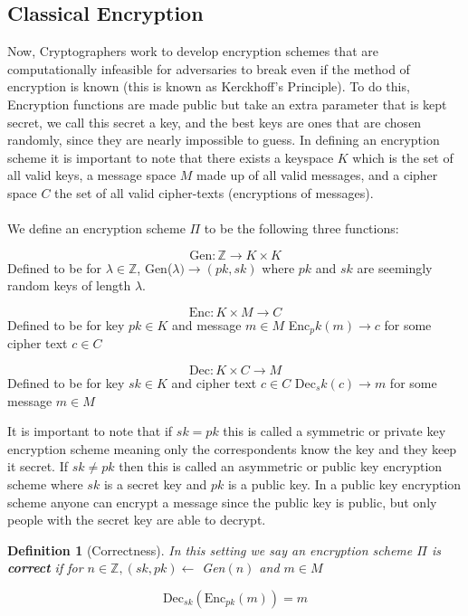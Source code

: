 \documentclass[12pt,twoside]{reedthesis}
\newtheorem{definition}{Definition}
\begin{document}
    \subsection{Classical Encryption}
    Now, Cryptographers work to develop encryption schemes that are computationally infeasible for adversaries to break even if the method of encryption is known (this is known as Kerckhoff's Principle). To do this, Encryption functions are made public but take an extra parameter that is kept secret, we call this secret a key, and the best keys are ones that are chosen randomly, since they are nearly impossible to guess. In defining an encryption scheme it is important to note that there exists a keyspace $K$ which is the set of all valid keys, a message space $M$ made up of all valid messages, and a cipher space $C$ the set of all valid cipher-texts (encryptions of messages).
 \\ \\
  We define an encryption scheme $\Pi$ to be the following three functions:
     
 
 $$\text{Gen}:\mathbb{Z} \rightarrow K \times K$$
 Defined to be for $\lambda \in \mathbb{Z}$, Gen($\lambda ) \rightarrow (pk,sk)$ where $pk$ and $sk$ are seemingly random keys of length $\lambda$.
 
  $$\text{Enc}:K \times M \rightarrow C$$
Defined to be for key $pk\in K$ and message $m\in M$ Enc$_pk(m) \rightarrow c$ for some cipher text $c\in C$
 
 $$\text{Dec}:K \times C \rightarrow M$$
 Defined to be for key $sk \in K$ and cipher text $c\in C$ Dec$_sk(c) \rightarrow m$ for some message $m\in M$
\par It is important to note that if $sk = pk$ this is called a symmetric or private key encryption scheme meaning only the correspondents know the key and they keep it secret. If $sk \not= pk$ then this is called an asymmetric or public key encryption scheme where $sk$ is a secret key and $pk$ is a public key. In a public key encryption scheme anyone can encrypt a message since the public key is public, but only people with the secret key are able to decrypt.


\begin{definition}[Correctness]
In this setting we say an encryption scheme $\Pi$ is \textbf{correct} if for $n\in \mathbb{Z} , (sk,pk) \leftarrow$ Gen$(n)$ and $m\in M$ 

$$\text{Dec}_{sk}(\text{Enc}_{pk}(m)) = m$$
\end{definition}
\end{document}
